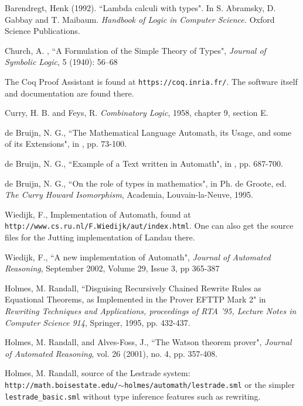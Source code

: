 \documentclass[12pt]{article}
\begin{document}
\begin{thebibliography}{99}

 Barendregt, Henk (1992). ``Lambda calculi with types". In S. Abramsky, D. Gabbay and T. Maibaum. {\em Handbook of Logic in Computer Science.\/}  Oxford Science Publications.

  Church, A. , ``A Formulation of the Simple Theory of Types", {\em Journal of Symbolic Logic\/}, 5 (1940): 56–68

  The Coq Proof Assistant is found at {\tt https://coq.inria.fr/}.  The software itself and documentation are found there.

 Curry, H. B. and Feys, R. {\em Combinatory Logic}, 1958, chapter 9, section E.

 de Bruijn, N. G., ``The Mathematical Language Automath, its Usage, and some of its Extensions", in \cite{automathbook}, pp. 73-100.

 de Bruijn, N. G., ``Example of a Text written in Automath", in \cite{automathbook}, pp. 687-700.

 de Bruijn, N. G., ``On the role of types in mathematics", in Ph. de Groote, ed.  {\em The Curry Howard Isomorphism}, Academia, Louvain-la-Neuve, 1995.

  Wiedijk, F., Implementation of Automath, found at {\tt http://www.cs.ru.nl/F.Wiedijk/aut/index.html}.  One can also get the source files for the Jutting implementation of Landau there.

 Wiedijk, F.,  ``A new implementation of Automath", {\em Journal of Automated Reasoning\/}, September 2002, Volume 29, Issue 3, pp 365-387

  Holmes, M. Randall, ``Disguising Recursively Chained Rewrite Rules as Equational Theorems, as Implemented in the Prover EFTTP Mark 2" in {\em Rewriting Techniques and Applications, proceedings of RTA '95, Lecture Notes in Computer Science 914}, Springer, 1995, pp. 432-437.

  Holmes, M. Randall, and Alves-Foss, J., ``The Watson theorem prover", {\em Journal  of
Automated Reasoning\/}, vol.  26 (2001), no.  4, pp.  357-408.

  Holmes, M. Randall, source of the Lestrade system:  {\tt http://math.boisestate.edu/$\sim$holmes/automath/lestrade.sml} or the simpler {\tt lestrade\_basic.sml} without type inference features such as rewriting.


\end{thebibliography}
\end{document}
